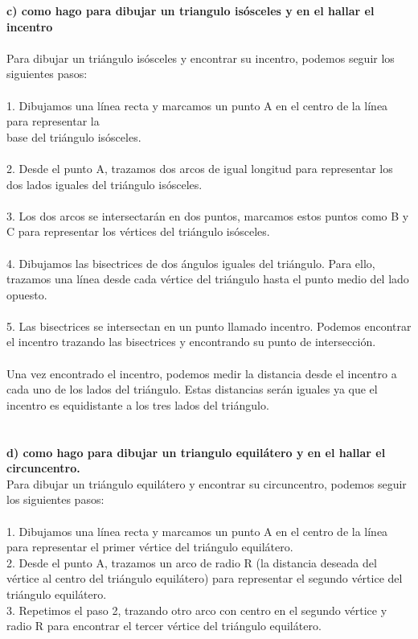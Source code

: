 \documentclass{article}
\begin{document}
{\bf c) como hago para dibujar un triangulo isósceles y en el hallar el incentro} \\
\\ 
Para dibujar un triángulo isósceles y encontrar su incentro, podemos seguir los siguientes pasos:\\
\\
1. Dibujamos una línea recta y marcamos un punto A en el centro de la línea para representar la\\
base del triángulo isósceles.\\
\\
2. Desde el punto A, trazamos dos arcos de igual longitud para representar los dos lados iguales del triángulo isósceles.\\
\\
3. Los dos arcos se intersectarán en dos puntos, marcamos estos puntos como B y C para representar los vértices del triángulo isósceles.\\
\\
4. Dibujamos las bisectrices de dos ángulos iguales del triángulo. Para ello, trazamos una línea desde cada vértice del triángulo hasta el punto medio del lado opuesto.\\
\\
5. Las bisectrices se intersectan en un punto llamado incentro. Podemos encontrar el incentro trazando las bisectrices y encontrando su punto de intersección.\\
\\
Una vez encontrado el incentro, podemos medir la distancia desde el incentro a cada uno de los lados del triángulo. Estas distancias serán iguales ya que el incentro es equidistante a los tres lados del triángulo.\\
\\
\\
{\bf d) como hago para dibujar un triangulo equilátero y en el hallar el circuncentro. }\\
Para dibujar un triángulo equilátero y encontrar su circuncentro, podemos seguir los siguientes pasos:\\
\\
1. Dibujamos una línea recta y marcamos un punto A en el centro de la línea para representar el primer vértice del triángulo equilátero.\\
2. Desde el punto A, trazamos un arco de radio R (la distancia deseada del vértice al centro del triángulo equilátero) para representar el segundo vértice del triángulo equilátero.\\
3. Repetimos el paso 2, trazando otro arco con centro en el segundo vértice y radio R para encontrar el tercer vértice del triángulo equilátero.\\
\end{document}
